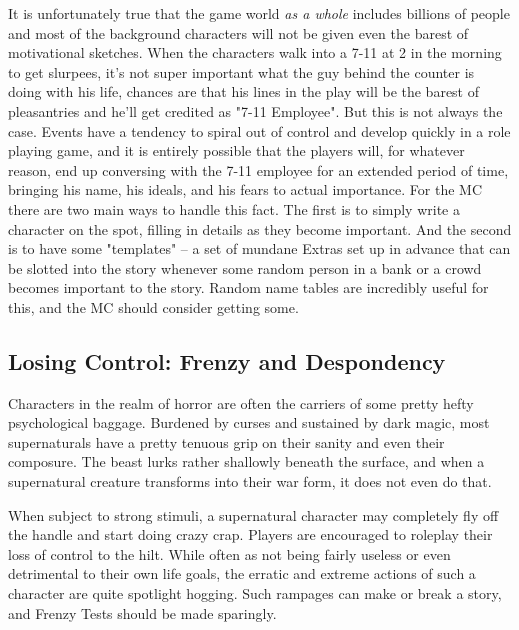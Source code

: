 It is unfortunately true that the game world \textit{as a whole} includes billions of people and most of the background characters will not be given even the barest of motivational sketches. When the characters walk into a 7-11 at 2 in the morning to get slurpees, it's not super important what the guy behind the counter is doing with his life, chances are that his lines in the play will be the barest of pleasantries and he'll get credited as "7-11 Employee". But this is not always the case. Events have a tendency to spiral out of control and develop quickly in a role playing game, and it is entirely possible that the players will, for whatever reason, end up conversing with the 7-11 employee for an extended period of time, bringing his name, his ideals, and his fears to actual importance. For the MC there are two main ways to handle this fact. The first is to simply write a character on the spot, filling in details as they become important. And the second is to have some "templates" -- a set of mundane Extras set up in advance that can be slotted into the story whenever some random person in a bank or a crowd becomes important to the story. Random name tables are incredibly useful for this, and the MC should consider getting some.

\subsection[Losing Control]{Losing Control: Frenzy and Despondency}

Characters in the realm of horror are often the carriers of some pretty hefty psychological baggage. Burdened by curses and sustained by dark magic, most supernaturals have a pretty tenuous grip on their sanity and even their composure. The beast lurks rather shallowly beneath the surface, and when a supernatural creature transforms into their war form, it does not even do that. 

When subject to strong stimuli, a supernatural character may completely fly off the handle and start doing crazy crap. Players are encouraged to roleplay their loss of control to the hilt. While often as not being fairly useless or even detrimental to their own life goals, the erratic and extreme actions of such a character are quite spotlight hogging. Such rampages can make or break a story, and Frenzy Tests should be made sparingly.

